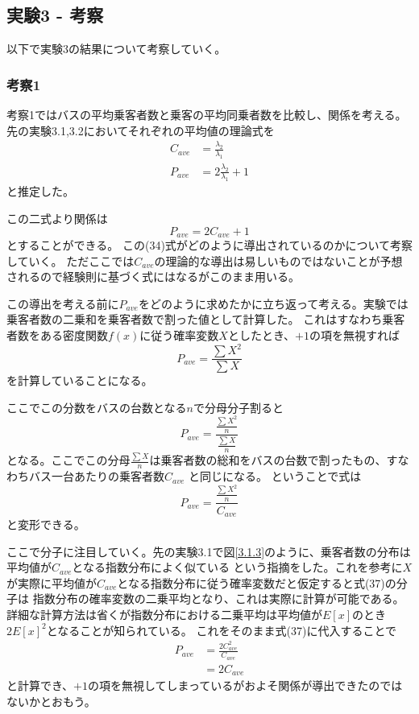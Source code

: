 \documentclass[a4paper,11pt,dvipdfmx]{jsarticle}
\begin{document}
\subsection{実験3 - 考察}
以下で実験3の結果について考察していく。
\subsubsection{考察1}
考察1ではバスの平均乗客者数と乗客の平均同乗者数を比較し、関係を考える。先の実験3.1,3.2においてそれぞれの平均値の理論式を
\begin{align}
    C_{ave} &= \frac{\lambda_2}{\lambda_1} \\
    P_{ave} &= 2\frac{\lambda_2}{\lambda_1}+1
\end{align}
と推定した。

この二式より関係は
\begin{equation}
    P_{ave} = 2C_{ave}+1
\end{equation}
とすることができる。
この(34)式がどのように導出されているのかについて考察していく。
ただここでは$C_{ave}$の理論的な導出は易しいものではないことが予想されるので経験則に基づく式にはなるがこのまま用いる。

この導出を考える前に$P_{ave}$をどのように求めたかに立ち返って考える。実験では乗客者数の二乗和を乗客者数で割った値として計算した。
これはすなわち乗客者数をある密度関数$f(x)$に従う確率変数$X$としたとき、$+1$の項を無視すれば
\begin{equation}
    P_{ave} = \frac{\sum X^2}{\sum X}
\end{equation}
を計算していることになる。

ここでこの分数をバスの台数となる$n$で分母分子割ると
\begin{equation}
    P_{ave} = \frac{\frac{\sum X^2}{n}}{\frac{\sum X}{n}}
\end{equation}
となる。ここでこの分母$\frac{\sum X}{n}$は乗客者数の総和をバスの台数で割ったもの、すなわちバス一台あたりの乗客者数$C_{ave}$
と同じになる。
ということで式は
\begin{equation}
    P_{ave} = \frac{\frac{\sum X^2}{n}}{C_{ave}}
\end{equation}
と変形できる。

ここで分子に注目していく。先の実験3.1で図\ref{3.1.3}のように、乗客者数の分布は平均値が$C_{ave}$となる指数分布によく似ている
という指摘をした。これを参考に$X$が実際に平均値が$C_{ave}$となる指数分布に従う確率変数だと仮定すると式(37)の分子は
指数分布の確率変数の二乗平均となり、これは実際に計算が可能である。
詳細な計算方法は省く\cite{exp}が指数分布における二乗平均は平均値が$E[x]$のとき$2E[x]^2$となることが知られている。
これをそのまま式(37)に代入することで
\begin{align}
    P_{ave} &= \frac{2C_{ave}^2}{C_{ave}} \\
            &= 2C_{ave}
\end{align}
と計算でき、$+1$の項を無視してしまっているがおよそ関係が導出できたのではないかとおもう。
\end{document}
